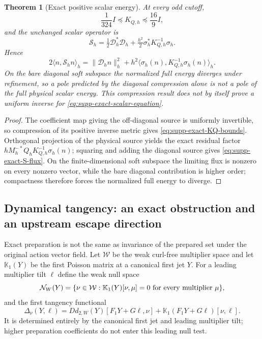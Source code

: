 \documentclass[11pt]{article}
\newtheorem{theorem}{Theorem}[section]
\numberwithin{equation}{section}
\theoremstyle{definition}
\theoremstyle{remark}
\begin{document}
\begin{theorem}[Exact positive scalar energy]
\label{thm:supp-exact-scalar-flux}
At every odd cutoff,
\begin{equation}
 \frac1{324}I\preceq K_{Q,h}\preceq\frac{16}{9}I,
 \label{eq:supp-exact-KQ-bounds}
\end{equation}
and the unchanged scalar operator is
\begin{equation}
 \mathscr S_h
 =\tfrac12\mathscr D_h^*\mathscr D_h
  +\tfrac{h^2}{2}\sigma_h^*K_{Q,h}^{-1}\sigma_h.
 \label{eq:supp-exact-S-flux}
\end{equation}
Hence
\begin{equation}
 2\langle n,\mathscr S_hn\rangle_h
 =\|\mathscr D_hn\|_h^2
  +h^2\langle\sigma_h(n),K_{Q,h}^{-1}\sigma_h(n)\rangle_h.
 \label{eq:supp-exact-scalar-energy}
\end{equation}
On the bare diagonal soft subspace the normalized full energy diverges under
refinement, so a pole predicted by the diagonal compression alone is not a
pole of the full physical scalar energy.  This compression result does not by
itself prove a uniform inverse for \eqref{eq:supp-exact-scalar-equation}.
\end{theorem}
\begin{proof}
The coefficient map giving the off-diagonal source is uniformly invertible,
so compression of its positive inverse metric gives
\eqref{eq:supp-exact-KQ-bounds}.  Orthogonal projection of the physical
source yields the exact residual factor
$hM_h^{-*}Q_hK_{Q,h}^{-1}\sigma_h(n)$; squaring and adding the diagonal
source gives \eqref{eq:supp-exact-S-flux}.  On the finite-dimensional soft
subspace the limiting flux is nonzero on every nonzero vector, while the
bare diagonal contribution is higher order; compactness therefore forces the
normalized full energy to diverge.
\end{proof}

\subsection{Dynamical tangency: an exact obstruction and an upstream escape direction}

Exact preparation is not the same as invariance of the prepared set under the
original action vector field.  Let $\mathcal W$ be the weak curl-free
multiplier space and let $\mathbb K_1(Y)$ be the first Poisson matrix at a
canonical first jet $Y$.  For a leading multiplier tilt $\ell$ define the
weak null space
\begin{equation}
 \mathcal N_W(Y)=\{\nu\in\mathcal W:
 \mathbb K_1(Y)[\nu,\mu]=0\ \hbox{for every multiplier }\mu\},
 \label{eq:supp-exact-weak-null}
\end{equation}
and the first tangency functional
\begin{equation}
 \Delta_\nu(Y,\ell)=
 Dd_{2,W}(Y)[F_1Y+G\ell,\nu]
 +\mathbb K_1(F_1Y+G\ell)[\nu,\ell].
 \label{eq:supp-exact-tangency-functional}
\end{equation}
It is determined entirely by the canonical first jet and leading multiplier
tilt; higher preparation coefficients do not enter this leading null test.
\end{document}
